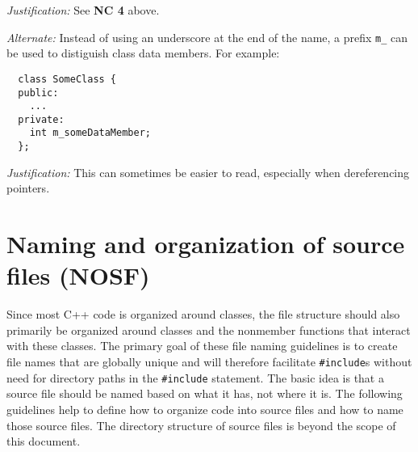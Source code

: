 \begin{itemize}
\textit{Justification:} See {}\textbf{NC 4} above.

\textit{Alternate:} Instead of using an underscore at the end of the name, a prefix {}\texttt{m\_} can be used to distiguish class data members.  For example:

{\small\begin{verbatim}
  class SomeClass {
  public:
    ...
  private:
    int m_someDataMember;
  };
\end{verbatim}}

\textit{Justification:}  This can sometimes be easier to read, especially when dereferencing pointers.

\end{itemize}


%
\section{Naming and organization of source files (NOSF)}
\label{sec:NOSF}
%

Since most C++ code is organized around classes, the file structure
should also primarily be organized around classes and the nonmember
functions that interact with these classes.  The primary goal of these
file naming guidelines is to create file names that are globally
unique and will therefore facilitate {}\texttt{\#include}s without
need for directory paths in the {}\texttt{\#include} statement.  The
basic idea is that a source file should be named based on what it has,
not where it is.  The following guidelines help to define how to
organize code into source files and how to name those source files.
The directory structure of source files is beyond the scope of this
document.


